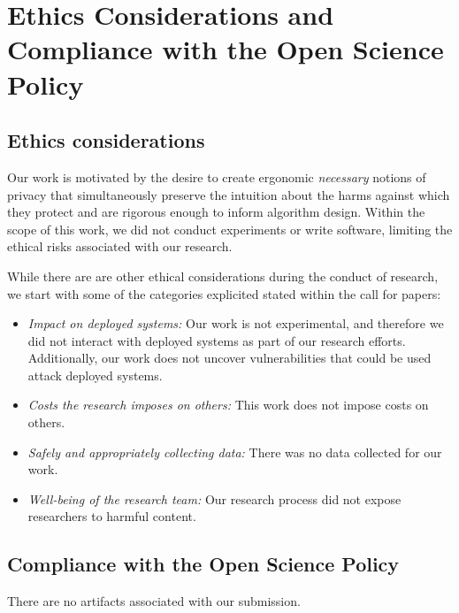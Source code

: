 \section{Ethics Considerations and Compliance with the Open Science Policy}
\subsection{Ethics considerations}

Our work is motivated by the desire to create ergonomic \emph{necessary} notions of privacy that simultaneously preserve the intuition about the harms against which they protect and are rigorous enough to inform algorithm design. Within the scope of this work, we did not conduct experiments or write software, limiting the ethical risks associated with our research. 

While there are are other ethical considerations during the conduct of research, we start with some of the categories explicited stated within the call for papers:
\begin{itemize}[--]

    \item \emph{Impact on deployed systems:} Our work is not experimental, and therefore we did not interact with deployed systems as part of our research efforts.  Additionally, our work does not uncover vulnerabilities that could be used attack deployed systems.  
        
    \item \emph{Costs the research imposes on others:} This work does not impose costs on others.

    \item \emph{Safely and appropriately collecting data:} There was no data collected for our work. 
    
    \item \emph{Well-being of the research team:} Our research process did not expose researchers to harmful content. 
\end{itemize}

\subsection{Compliance with the Open Science Policy}

There are no artifacts associated with our submission.
